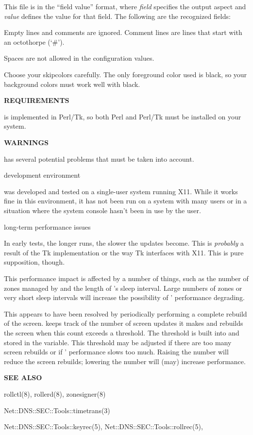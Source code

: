 This file is in the ``field value'' format, where {\it field} specifies the
output aspect and {\it value} defines the value for that field.  The following
are the recognized fields:

Empty lines and comments are ignored.  Comment lines are lines that start with
an octothorpe (`\#').

Spaces are not allowed in the configuration values.

Choose your skipcolors carefully.  The only foreground color used is black, so
your background colors must work well with black.

{\bf REQUIREMENTS}

 is implemented in Perl/Tk, so both Perl and Perl/Tk must be
installed on your system.

{\bf WARNINGS}

 has several potential problems that must be taken into
account.

\begin{description}

\item development environment\verb" "

 was developed and tested on a single-user system running
X11.  While it works fine in this environment, it has not been run on a system
with many users or in a situation where the system console hasn't been in use
by the  user.

\item long-term performance issues\verb" "

In early tests, the longer  runs, the slower the updates
become.  This is {\it probably} a result of the Tk implementation or the way
Tk interfaces with X11.  This is pure supposition, though.

This performance impact is affected by a number of things, such as the number
of zones managed by  and the length of 's sleep
interval.  Large numbers of zones or very short sleep intervals will increase
the possibility of ' performance degrading.

This appears to have been resolved by periodically performing a complete
rebuild of the screen.   keeps track of the number of
screen updates it makes and rebuilds the screen when this count exceeds a
threshold.  The threshold is built into  and stored in the
 variable.  This threshold may be adjusted if there are too
many screen rebuilds or if ' performance slows too much.
Raising the number will reduce the screen rebuilds; lowering the number will
(may) increase performance.

\end{description}

{\bf SEE ALSO}

rollctl(8),
rollerd(8),
zonesigner(8)

Net::DNS::SEC::Tools::timetrans(3)

Net::DNS::SEC::Tools::keyrec(5),
Net::DNS::SEC::Tools::rollrec(5),

